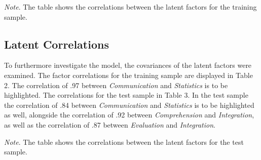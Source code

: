 \documentclass[
  12pt,
  a4paper,
  twoside]{article}
\begin{document}
\begin{table}[htpb]
\caption{Latent Factor correlations training sample}


\vspace{10pt}  %
\small\textit{Note}. The table shows the correlations between the latent factors for the training sample.
\end{table}

\subsection{Latent Correlations}\label{latent-correlations}

To furthermore investigate the model, the covariances of the latent factors were examined. The factor correlations for the training sample are displayed in Table 2. The correlation of .97 between \emph{Communication} and \emph{Statistics} is to be highlighted. The correlations for the test sample in Table 3. In the test sample the correlation of .84 between \emph{Communication} and \emph{Statistics} is to be highlighted as well, alongside the correlation of .92 between \emph{Comprehension} and \emph{Integration}, as well as the correlation of .87 between \emph{Evaluation} and \emph{Integration}.

\begin{table}[htpb]
\caption{Latent Factor correlations test sample}


\vspace{10pt}  %
\small\textit{Note}. The table shows the correlations between the latent factors for the test sample.
\end{table}
\end{document}

